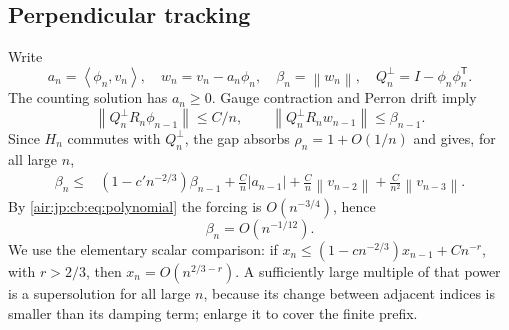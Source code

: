 \documentclass[11pt,letterpaper]{article}
\numberwithin{equation}{section}
\theoremstyle{remark}
\newcommand{\norm}[1]{\left\lVert#1\right\rVert}
\newcommand{\ip}[2]{\left\langle#1,#2\right\rangle}
\begin{document}
\subsection{Perpendicular tracking}
Write
\[
 a_n=\ip{\phi_n}{v_n},\quad w_n=v_n-a_n\phi_n,\quad\beta_n=\norm{w_n},
 \quad Q_n^\perp=I-\phi_n\phi_n^{\mathsf T}.
\]
The counting solution has $a_n\ge0$. Gauge contraction and Perron drift imply
\[
 \norm{Q_n^\perp R_n\phi_{n-1}}\le C/n,\qquad
 \norm{Q_n^\perp R_nw_{n-1}}\le\beta_{n-1}.
\]
Since $H_n$ commutes with $Q_n^\perp$, the gap absorbs $\rho_n=1+O(1/n)$ and gives, for all large $n$,
\begin{align}
 \beta_n\le{}&(1-c'n^{-2/3})\beta_{n-1}
 +\frac Cn|a_{n-1}|+\frac Cn\norm{v_{n-2}}+\frac C{n^2}\norm{v_{n-3}}.\label{air:jp:cb:eq:betarecurrence}
\end{align}
By \eqref{air:jp:cb:eq:polynomial} the forcing is $O(n^{-3/4})$, hence
\begin{equation}\label{air:jp:cb:eq:betafirst}
 \beta_n=O(n^{-1/12}).
\end{equation}
We use the elementary scalar comparison: if $x_n\le(1-cn^{-2/3})x_{n-1}+Cn^{-r}$, with $r>2/3$, then $x_n=O(n^{2/3-r})$. A sufficiently large multiple of that power is a supersolution for all large $n$, because its change between adjacent indices is smaller than its damping term; enlarge it to cover the finite prefix.
\end{document}
